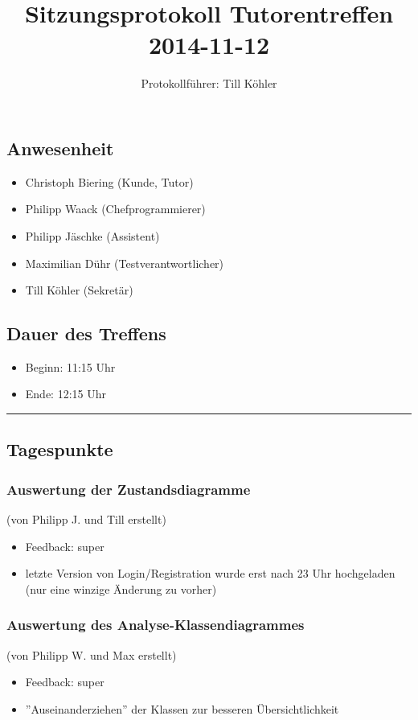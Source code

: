 \documentclass[12pt,a4paper]{article}
\author{Protokollführer: Till Köhler}
\title{Sitzungsprotokoll Tutorentreffen 2014-11-12}
\date{}
\begin{document}
\maketitle

\subsection*{Anwesenheit}
\medskip
\begin{itemize}
\item Christoph Biering (Kunde, Tutor)
\item Philipp Waack (Chefprogrammierer)
\item Philipp Jäschke (Assistent)
\item Maximilian Dühr (Testverantwortlicher)
\item Till Köhler (Sekretär)
\end{itemize}

\subsection*{Dauer des Treffens}
\medskip
\begin{itemize}
\item Beginn: 11:15 Uhr
\item Ende: 12:15 Uhr
\end{itemize}

\noindent\rule{\textwidth}{1pt}

\subsection*{Tagespunkte}
\medskip

\subsubsection*{Auswertung der Zustandsdiagramme}
(von Philipp J. und Till erstellt)
\begin{itemize}
\item Feedback: super
\item letzte Version von Login/Registration wurde erst nach 23 Uhr hochgeladen (nur eine winzige Änderung zu vorher)
\end{itemize}

\subsubsection*{Auswertung des Analyse-Klassendiagrammes}
(von Philipp W. und Max erstellt)
\begin{itemize}
\item Feedback: super
\item ''Auseinanderziehen'' der Klassen zur besseren Übersichtlichkeit
\end{itemize}
\end{document}
